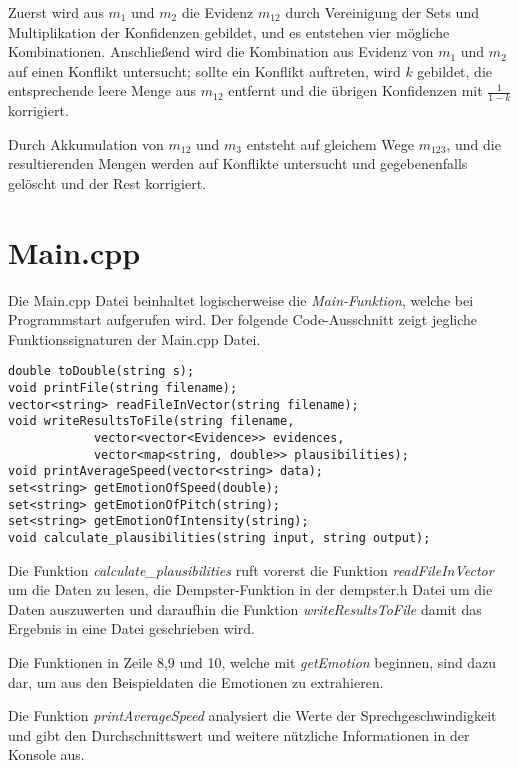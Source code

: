 Zuerst wird aus \(m_1\) und \(m_2\) die Evidenz \(m_{12}\) durch Vereinigung der Sets und Multiplikation der Konfidenzen gebildet, und es entstehen vier mögliche Kombinationen. Anschließend wird die Kombination aus Evidenz von \(m_1\) und \(m_2\) auf einen Konflikt untersucht; sollte ein Konflikt auftreten, wird \(k\) gebildet, die entsprechende leere Menge aus \(m_{12}\) entfernt und die übrigen Konfidenzen mit \(\frac{1}{1-k}\) korrigiert.

Durch Akkumulation von \(m_{12}\) und \(m_3\) entsteht auf gleichem Wege \(m_{123}\), und die resultierenden Mengen werden auf Konflikte untersucht und gegebenenfalls gelöscht und der Rest korrigiert. 
 
\section{Main.cpp}
Die Main.cpp Datei beinhaltet logischerweise die \textit{Main-Funktion}, welche bei Programmstart aufgerufen wird.
Der folgende Code-Ausschnitt zeigt jegliche Funktionssignaturen der Main.cpp Datei.

\begin{lstlisting}[caption=Signaturen der Funktionen der Main.cpp Datei, label=Bsp.1]
double toDouble(string s);
void printFile(string filename);
vector<string> readFileInVector(string filename);
void writeResultsToFile(string filename, 
            vector<vector<Evidence>> evidences, 
            vector<map<string, double>> plausibilities);
void printAverageSpeed(vector<string> data);
set<string> getEmotionOfSpeed(double);
set<string> getEmotionOfPitch(string);
set<string> getEmotionOfIntensity(string);
void calculate_plausibilities(string input, string output);
\end{lstlisting}
Die Funktion \textit{calculate\_plausibilities} ruft vorerst die Funktion \textit{readFileInVector} um die Daten zu lesen, die Dempster-Funktion in der dempster.h Datei um die Daten auszuwerten und daraufhin die Funktion \textit{writeResultsToFile} damit das Ergebnis in eine Datei geschrieben wird.


Die Funktionen in Zeile 8,9 und 10, welche mit \textit{getEmotion} beginnen, sind dazu dar, um aus den Beispieldaten die Emotionen zu extrahieren.


Die Funktion \textit{printAverageSpeed} analysiert die Werte der Sprechgeschwindigkeit und gibt den Durchschnittswert und weitere nützliche Informationen in der Konsole aus.

